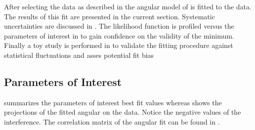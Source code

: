 After selecting the data as described in  the angular model of  is fitted to the data.
The results of this fit are presented in the current section. Systematic uncertainties are discussed in .
The likelihood function is profiled versus the parameters of interest in  to gain confidence on the validity
of the minimum. Finally a toy study is performed in  to validate the fitting procedure against
statistical fluctuations and asses potential fit bias

\subsection{Parameters of Interest}
\label{Parameters_of_Interest}

 summarizes the parameters of interest best fit values whereas
 shows the projections of the fitted angular \pdf on the data.
Notice the negative values of the \spwave interference. The correlation matrix of the
angular fit can be found in .

